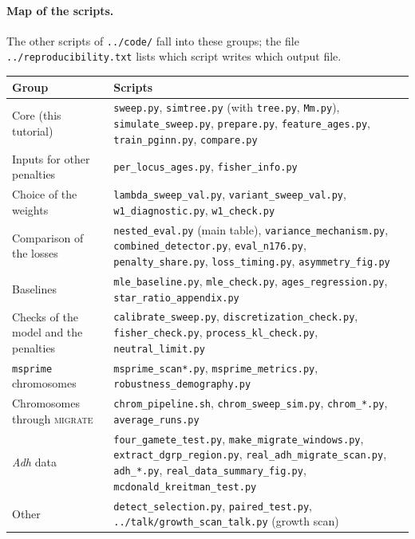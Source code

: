 \documentclass[11pt]{article}
\newcommand{\file}[1]{\texttt{#1}}
\newcommand{\migrate}{\textsc{migrate}\xspace}
\begin{document}
\paragraph{Map of the scripts.}
The other scripts of \file{../code/} fall into these groups; the file
\file{../reproducibility.txt} lists which script writes which output
file.
\begin{center}
\small
\begin{tabular}{@{}>{\raggedright\arraybackslash}p{}>{\raggedright\arraybackslash}p{}@{}}
\toprule
Group & Scripts \\
\midrule
Core (this tutorial) & \file{sweep.py}, \file{simtree.py} (with \file{tree.py}, \file{Mm.py}), \file{simulate\_sweep.py}, \file{prepare.py}, \file{feature\_ages.py}, \file{train\_pginn.py}, \file{compare.py} \\
Inputs for other penalties & \file{per\_locus\_ages.py}, \file{fisher\_info.py} \\
Choice of the weights & \file{lambda\_sweep\_val.py}, \file{variant\_sweep\_val.py}, \file{w1\_diagnostic.py}, \file{w1\_check.py} \\
Comparison of the losses & \file{nested\_eval.py} (main table), \file{variance\_mechanism.py}, \file{combined\_detector.py}, \file{eval\_n176.py}, \file{penalty\_share.py}, \file{loss\_timing.py}, \file{asymmetry\_fig.py} \\
Baselines & \file{mle\_baseline.py}, \file{mle\_check.py}, \file{ages\_regression.py}, \file{star\_ratio\_appendix.py} \\
Checks of the model and the penalties & \file{calibrate\_sweep.py}, \file{discretization\_check.py}, \file{fisher\_check.py}, \file{process\_kl\_check.py}, \file{neutral\_limit.py} \\
\texttt{msprime} chromosomes & \file{msprime\_scan*.py}, \file{msprime\_metrics.py}, \file{robustness\_demography.py} \\
Chromosomes through \migrate & \file{chrom\_pipeline.sh}, \file{chrom\_sweep\_sim.py}, \file{chrom\_*.py}, \file{average\_runs.py} \\
\emph{Adh} data & \file{four\_gamete\_test.py}, \file{make\_migrate\_windows.py}, \file{extract\_dgrp\_region.py}, \file{real\_adh\_migrate\_scan.py}, \file{adh\_*.py}, \file{real\_data\_summary\_fig.py}, \file{mcdonald\_kreitman\_test.py} \\
Other & \file{detect\_selection.py}, \file{paired\_test.py}, \file{../talk/growth\_scan\_talk.py} (growth scan) \\
\bottomrule
\end{tabular}
\end{center}
\end{document}
